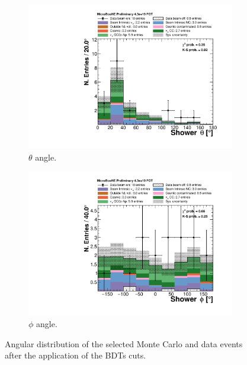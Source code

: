 \begin{figure}[htbp]
\centering
  \begin{subfigure}{0.48\textwidth}
    \includegraphics[width=\linewidth]{figures/theta_bdt.pdf}
    \caption{$\theta$ angle.} 
  \end{subfigure}
    \begin{subfigure}{0.48\textwidth}
    \includegraphics[width=\linewidth]{figures/phi_bdt.pdf}
    \caption{$\phi$ angle.} 
  \end{subfigure}
  \caption{Angular distribution of the selected Monte Carlo and data events after the application of the BDTs cuts.}
  \label{fig:angle_bdt}
\end{figure}

